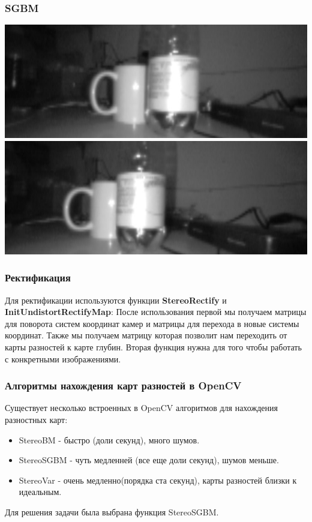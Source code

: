 \documentclass{beamer}
\begin{document}
		\begin{frame}
		    \frametitle{SGBM}
		   
		    \begin{center}
				\includegraphics[scale=0.4]{images/rectL}
				\includegraphics[scale=0.4]{images/rectR}
			\end{center}
		\end{frame}
		\begin{frame}
			\frametitle{Ректификация}
			Для ректификации используются функции \textbf{StereoRectify} и \textbf{InitUndistortRectifyMap}: После использования первой мы получаем матрицы для поворота систем координат камер и матрицы для перехода в новые системы координат. Также мы получаем матрицу которая позволит нам переходить от карты разностей к карте глубин. Вторая функция нужна для того чтобы работать с конкретными изображениями.
		\end{frame}
		\begin{frame}
			\frametitle{Алгоритмы нахождения карт разностей в OpenCV}
			Существует несколько встроенных в OpenCV алгоритмов для нахождения разностных карт:
			\begin{itemize}
				\item StereoBM - быстро (доли секунд), много шумов.
				\item StereoSGBM - чуть медленней (все еще доли секунд), шумов меньше.
				\item StereoVar - очень медленно(порядка ста секунд), карты разностей близки к идеальным.
			\end{itemize}	
			Для решения задачи была выбрана функция StereoSGBM.
		\end{frame}
\end{document}
